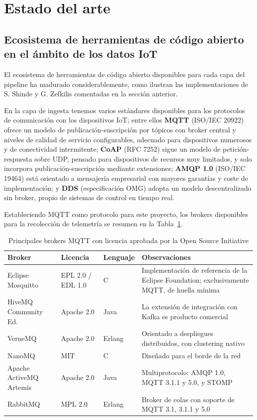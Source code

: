\section{Estado del arte}

\subsection{Ecosistema de herramientas de código abierto en el ámbito de los datos IoT}
\label{sec:benchmarks-series-temporales}

El ecosistema de herramientas de código abierto disponibles para cada capa del pipeline ha madurado considerablemente, como ilustran las implementaciones de S. Shinde \cite{shinde2025} y G. Zefkilis \cite{zefkilis2025} comentadas en la sección anterior.

En la capa de ingesta tenemos varios estándares disponibles para los protocolos de comunicación con los dispositivos IoT; entre ellos \textbf{MQTT} (ISO/IEC 20922) ofrece un modelo de publicación-suscripción por tópicos con broker central y niveles de calidad de servicio configurables, adecuado para dispositivos numerosos y de conectividad intermitente; \textbf{CoAP} (RFC 7252) sigue un modelo de petición-respuesta sobre UDP, pensado para dispositivos de recursos muy limitados, y solo incorpora publicación-suscripción mediante extensiones; \textbf{AMQP 1.0} (ISO/IEC 19464) está orientado a mensajería empresarial con mayores garantías y coste de implementación; y \textbf{DDS} (especificación OMG) adopta un modelo descentralizado sin broker, propio de sistemas de control en tiempo real.

Estableciendo MQTT como protocolo para este proyecto, los brokers disponibles para la recolección de telemetría se resumen en la Tabla~\ref{tab:brokers-mqtt}.

\begin{table}[ht!]
  \centering
  \small
  \begin{tabular}{|l|l|l|p{5.6cm}|}
    \hline
    \textbf{Broker} & \textbf{Licencia} & \textbf{Lenguaje} & \textbf{Observaciones} \\ \hline
    Eclipse Mosquitto & EPL 2.0 / EDL 1.0 & C & Implementación de referencia de la Eclipse Foundation; exclusivamente MQTT, de huella mínima \\ \hline
    HiveMQ Community Ed. & Apache 2.0 & Java & La extensión de integración con Kafka es producto comercial \\ \hline
    VerneMQ & Apache 2.0 & Erlang & Orientado a despliegues distribuidos, con clustering nativo \\ \hline
    NanoMQ & MIT & C & Diseñado para el borde de la red \\ \hline
    Apache ActiveMQ Artemis & Apache 2.0 & Java & Multiprotocolo: AMQP 1.0, MQTT 3.1.1 y 5.0, y STOMP \\ \hline
    RabbitMQ & MPL 2.0 & Erlang & Broker de colas con soporte de MQTT 3.1, 3.1.1 y 5.0 \\ \hline
  \end{tabular}
  \caption{Principales brokers MQTT con licencia aprobada por la Open Source Initiative}
  \label{tab:brokers-mqtt}
\end{table}

